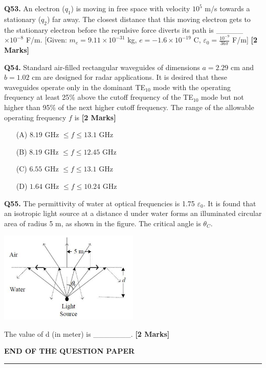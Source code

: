 \documentclass[11pt]{article}
\newcommand{\questionb}[2]{
    \noindent\textbf{Q#2.} #1 \hfill \textbf{[2 Marks]}
}
\begin{document}
\vspace{0.5cm}

\questionb{An electron ($q_1$) is moving in free space with velocity $10^5$ m/s towards a stationary ($q_2$) far away. The closest distance that this moving electron gets to the stationary electron before the repulsive force diverts its path is \_\_\_\_\_ $\times 10^{-8}$ F/m. 
[Given: $m_e = 9.11 \times 10^{-31}$ kg, $e = -1.6 \times 10^{-19}$ C, $\varepsilon_0 = \frac{10^{-9}}{36\pi}$ F/m]}{53}

\vspace{0.5cm}

\questionb{Standard air-filled rectangular waveguides of dimensions $a = 2.29$ cm and $b = 1.02$ cm are designed for radar applications. It is desired that these waveguides operate only in the dominant TE$_{10}$ mode with the operating frequency at least 25\% above the cutoff frequency of the TE$_{10}$ mode but not higher than 95\% of the next higher cutoff frequency. The range of the allowable operating frequency $f$ is}{54}
\begin{enumerate}
    \item[(A)] $8.19$ GHz $\leq f \leq 13.1$ GHz
    \item[(B)] $8.19$ GHz $\leq f \leq 12.45$ GHz
    \item[(C)] $6.55$ GHz $\leq f \leq 13.1$ GHz
    \item[(D)] $1.64$ GHz $\leq f \leq 10.24$ GHz
\end{enumerate}

\vspace{0.5cm}

\questionb{The permittivity of water at optical frequencies is 1.75 $\varepsilon_0$. It is found that an isotropic light source at a distance d under water forms an illuminated circular area of radius 5 m, as shown in the figure. The critical angle is $\theta_C$.
\begin{center}
\includegraphics[width=0.5\textwidth]{figures/55.png}
\end{center}
The value of d (in meter) is \_\_\_\_\_\_\_.}{55}

\vspace{5cm}
\begin{center}
\textbf{END OF THE QUESTION PAPER}
\rule{\textwidth}{0.5pt} 
\end{center}
\end{document}
